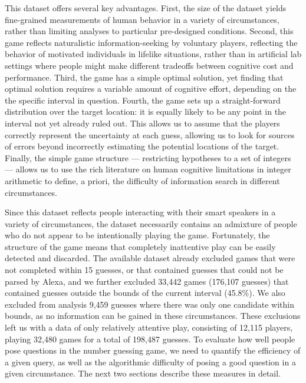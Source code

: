 \documentclass[10pt,letterpaper]{article}
\begin{document}
This dataset offers several key advantages. 
First, the size of the dataset yields fine-grained measurements of human behavior in a variety of circumstances, rather than limiting analyses to particular pre-designed conditions.
Second, this game reflects naturalistic information-seeking by voluntary players, reflecting the behavior of motivated individuals in lifelike situations, rather than in artificial lab settings where people might make different tradeoffs between cognitive cost and performance.
Third, the game has a simple optimal solution, yet finding that optimal solution requires a variable amount of cognitive effort, depending on the the specific interval in question.  
Fourth, the game sets up a straight-forward distribution over the target location: it is equally likely to be any point in the interval not yet already ruled out. This allows us to assume that the players correctly represent the uncertainty at each guess, allowing us to look for sources of errors beyond incorrectly estimating the potential locations of the target. 
Finally, the simple game structure --- restricting hypotheses to a set of integers --- allows us to use the rich literature on human cognitive limitations in integer arithmetic to define, a priori, the difficulty of information search in different circumstances.

Since this dataset reflects people interacting with their smart speakers in a variety of circumstances, the dataset necessarily contains an admixture of people who do not appear to be intentionally playing the game. 
Fortunately, the structure of the game means that completely inattentive play can be easily detected and discarded.
The available dataset already excluded games that were not completed within 15 guesses, or that contained guesses that could not be parsed by Alexa, and we further excluded 33,442 games (176,107 guesses) that contained guesses outside the bounds of the current interval (45.8\%). We also excluded from analysis 9,459 guesses where there was only one candidate within bounds, as no information can be gained in these circumstances.
These exclusions left us with a data of only relatively attentive play, consisting of 12,115 players, playing 32,480 games for a total of 198,487 guesses.
To evaluate how well people pose questions in the number guessing game, we need to quantify the efficiency of a given query, as well as the algorithmic difficulty of posing a good question in a given circumstance. The next two sections describe these measures in detail.
\end{document}

